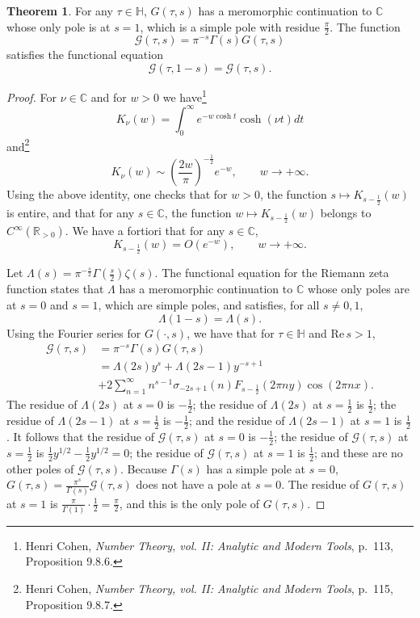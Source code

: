 \documentclass{article}
\def\Re{\ensuremath{\mathrm{Re}}\,}
\theoremstyle{definition}
\newtheorem{theorem}{Theorem}
\theoremstyle{definition}
\begin{document}
\begin{theorem}
For any $\tau \in \mathbb{H}$, $G(\tau,s)$ has a meromorphic continuation to $\mathbb{C}$ whose only pole is at $s=1$, which is a simple pole with residue
$\frac{\pi}{2}$. The function
\[
\mathcal{G}(\tau,s) = \pi^{-s} \Gamma(s) G(\tau,s)
\]
satisfies the functional equation
\[
\mathcal{G}(\tau,1-s) = \mathcal{G}(\tau,s).
\]
\label{Gfunctional}
\end{theorem}
\begin{proof}
For $\nu \in \mathbb{C}$
and for $w>0$ we have\footnote{Henri Cohen, {\em Number Theory, vol. II: Analytic and Modern Tools}, p.~113, Proposition 9.8.6.}
\[
K_\nu(w) = \int_0^\infty e^{-w\cosh t} \cosh(\nu t) dt
\]
and\footnote{Henri Cohen, {\em Number Theory, vol. II: Analytic and Modern Tools}, p.~115, Proposition 9.8.7.}
\[
K_\nu(w) \sim \left(\frac{2w}{\pi}\right)^{-\frac{1}{2}} e^{-w}, \qquad w \to +\infty.
\]
Using the above identity, one checks that for $w>0$, the function $s \mapsto K_{s-\frac{1}{2}}(w)$ is entire, and that
for any $s \in \mathbb{C}$, the function $w \mapsto K_{s-\frac{1}{2}}(w)$ belongs to $C^\infty(\mathbb{R}_{>0})$.
We have a fortiori that for any $s \in \mathbb{C}$,
\[
K_{s-\frac{1}{2}}(w) = O(e^{-w}), \qquad w \to +\infty.
\]

Let $\Lambda(s)=\pi^{-\frac{s}{2}} \Gamma\left(\frac{s}{2}\right) \zeta(s)$. The functional equation for the Riemann zeta function
states that $\Lambda$ has a meromorphic continuation to $\mathbb{C}$ whose only poles are at $s=0$ and $s=1$, which are simple poles,
and satisfies, for all $s \neq 0,1$,
\[
\Lambda(1-s)=\Lambda(s).
\]
Using the Fourier series for $G(\cdot,s)$, we have that for $\tau \in \mathbb{H}$ and $\Re s>1$,
\begin{align*}
\mathcal{G}(\tau,s)&= \pi^{-s} \Gamma(s) G(\tau,s)\\
&=\Lambda(2s) y^s + \Lambda(2s-1) y^{-s+1}\\
&+2\sum_{n=1}^\infty n^{s-1} \sigma_{-2s+1}(n) F_{s-\frac{1}{2}}(2\pi ny) \cos(2\pi nx).
\end{align*}
The residue of $\Lambda(2s)$ at $s=0$ is $-\frac{1}{2}$;
the residue of $\Lambda(2s)$ at $s=\frac{1}{2}$ is $\frac{1}{2}$;
the residue of $\Lambda(2s-1)$ at $s=\frac{1}{2}$ is $-\frac{1}{2}$;
and the residue of $\Lambda(2s-1)$ at $s=1$ is $\frac{1}{2}$. It follows that 
the residue of $\mathcal{G}(\tau,s)$ at $s=0$ is $-\frac{1}{2}$; the residue of $\mathcal{G}(\tau,s)$ at
$s=\frac{1}{2}$ is $\frac{1}{2}y^{1/2}-\frac{1}{2}y^{1/2}=0$;
 the residue of $\mathcal{G}(\tau,s)$ at $s=1$ is $\frac{1}{2}$; and these are no other poles of $\mathcal{G}(\tau,s)$. 
Because $\Gamma(s)$ has a simple pole at $s=0$, $G(\tau,s)  = \frac{\pi^s}{\Gamma(s)} \mathcal{G}(\tau,s)$
does not have a pole at $s=0$. The residue of $G(\tau,s)$ at $s=1$ is
$\frac{\pi}{\Gamma(1)} \cdot \frac{1}{2}=\frac{\pi}{2}$, and this is the only pole of $G(\tau,s)$. 


\end{proof}
\end{document}
